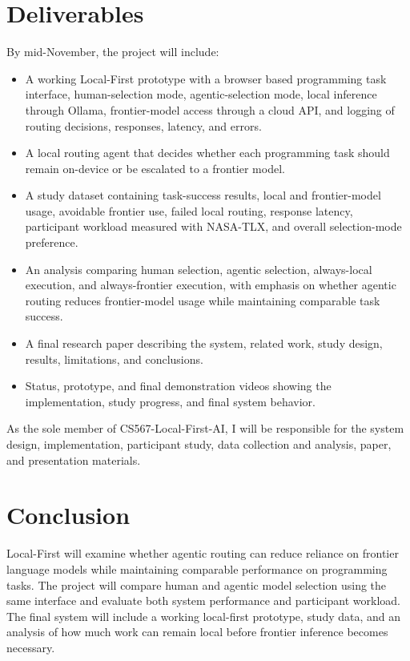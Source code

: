 \documentclass[sigconf,nonacm]{acmart}
\begin{document}
\section{Deliverables}
\label{sec:deliverables}
By mid-November, the project will include:

\begin{itemize}
    \item A working Local-First prototype with a browser based programming task interface, human-selection mode, agentic-selection mode, local inference through Ollama, frontier-model access through a cloud API, and logging of routing decisions, responses, latency, and errors.
    
    \item A local routing agent that decides whether each programming task should remain on-device or be escalated to a frontier model.
    
    \item A study dataset containing task-success results, local and frontier-model usage, avoidable frontier use, failed local routing, response latency, participant workload measured with NASA-TLX, and overall selection-mode preference.
    
    \item An analysis comparing human selection, agentic selection, always-local execution, and always-frontier execution, with emphasis on whether agentic routing reduces frontier-model usage while maintaining comparable task success.
    
    \item A final research paper describing the system, related work, study design, results, limitations, and conclusions.
    
    \item Status, prototype, and final demonstration videos showing the implementation, study progress, and final system behavior.
\end{itemize}

As the sole member of CS567-Local-First-AI, I will be responsible for the system design, implementation, participant study, data collection and analysis, paper, and presentation materials.

\section{Conclusion}
Local-First will examine whether agentic routing can reduce reliance on frontier language models while maintaining comparable performance on programming tasks. The project will compare human and agentic model selection using the same interface and evaluate both system performance and participant workload. The final system will include a working local-first prototype, study data, and an analysis of how much work can remain local before frontier inference becomes necessary.
\end{document}
